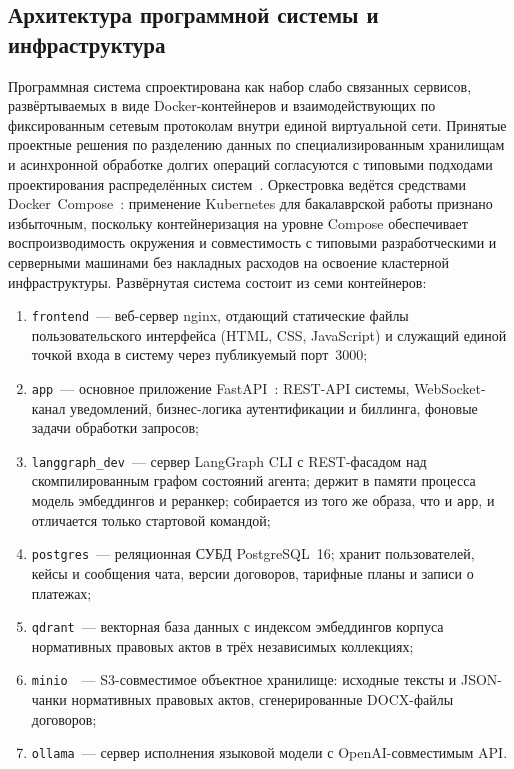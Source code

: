 \subsection{Архитектура программной системы и инфраструктура}

Программная система спроектирована как набор слабо связанных сервисов, развёртываемых в виде Docker-контейнеров и взаимодействующих по фиксированным сетевым протоколам внутри единой виртуальной сети. Принятые проектные решения по разделению данных по специализированным хранилищам и асинхронной обработке долгих операций согласуются с типовыми подходами проектирования распределённых систем~\cite{tanenbaum2023distributed}. Оркестровка ведётся средствами Docker~Compose~\cite{docker_compose_docs}: применение Kubernetes для бакалаврской работы признано избыточным, поскольку контейнеризация на уровне Compose обеспечивает воспроизводимость окружения и совместимость с типовыми разработческими и серверными машинами без накладных расходов на освоение кластерной инфраструктуры. Развёрнутая система состоит из семи контейнеров:

\begin{enumerate}
    \item \texttt{frontend}~--- веб-сервер nginx, отдающий статические файлы пользовательского интерфейса (HTML, CSS, JavaScript) и служащий единой точкой входа в систему через публикуемый порт~3000;
    \item \texttt{app}~--- основное приложение FastAPI~\cite{fastapi_docs}: REST-API системы, WebSocket-канал уведомлений, бизнес-логика аутентификации и биллинга, фоновые задачи обработки запросов;
    \item \texttt{langgraph\_dev}~--- сервер LangGraph CLI с REST-фасадом над скомпилированным графом состояний агента; держит в памяти процесса модель эмбеддингов и реранкер; собирается из того же образа, что и \texttt{app}, и отличается только стартовой командой;
    \item \texttt{postgres}~--- реляционная СУБД PostgreSQL~16; хранит пользователей, кейсы и сообщения чата, версии договоров, тарифные планы и записи о платежах;
    \item \texttt{qdrant}~--- векторная база данных с индексом эмбеддингов корпуса нормативных правовых актов в трёх независимых коллекциях;
    \item \texttt{minio}~\cite{minio_docs}~--- S3-совместимое объектное хранилище: исходные тексты и JSON-чанки нормативных правовых актов, сгенерированные DOCX-файлы договоров;
    \item \texttt{ollama}~--- сервер исполнения языковой модели с OpenAI-совместимым API.
\end{enumerate}

